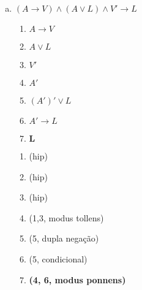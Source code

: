 \documentclass[a4paper, 12pt, addpoints]{exam}
\begin{document}
\begin{questions}
\begin{resp}
\begin{enumerate}[a)]
\begin{multicols}{2}
        \columnbreak

        \begin{enumerate}[\ding{32}]
          \item (hip)
          \item (hip)
          \item (hip)
          \item (1, simplificação)
          \item (2,4, modus tollens)
          \item (5, De Morgan)
          \item (6, simplificação)
          \item (7, dupla negação)
          \item \textbf{(3, 8, conjunção)}
        \end{enumerate}

      \end{multicols}
      
      \item $(A\rightarrow V) \land (A \lor L) \land V' \rightarrow L $
      \begin{multicols}{2}

        \begin{enumerate}[1.]
          \item $A\rightarrow V$
          \item $A \lor L$
          \item $V'$
          \item $A'$
          \item $(A')' \lor L$
          \item $A' \rightarrow L$
          \item $\boldsymbol{L}$
        \end{enumerate}
        
        \columnbreak

        \begin{enumerate}[\ding{32}]
          \item (hip)
          \item (hip)
          \item (hip)
          \item (1,3, modus tollens)
          \item (5, dupla negação)
          \item (5, condicional)
          \item \textbf{(4, 6, modus ponnens)}
        \end{enumerate}


\end{multicols}
\end{enumerate}
\end{resp}
\end{questions}
\end{document}

